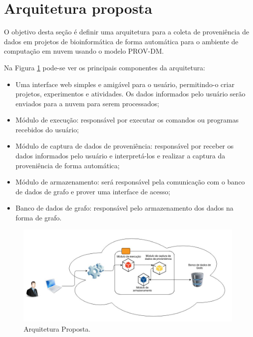 \section{Arquitetura proposta}

O objetivo desta seção é definir uma arquitetura para a coleta de proveniência de dados em projetos de bioinformática de forma automática para o ambiente de computação em nuvem usando o modelo PROV-DM.

Na Figura \ref{fig:arquitetura} pode-se ver os principais componentes da arquitetura: 

\begin{itemize}
\item Uma interface web simples e amigável para o usuário, permitindo-o criar projetos, experimentos e atividades. Os dados informados pelo usuário serão enviados para a nuvem para serem processados;
\item Módulo de execução: responsável por executar os comandos ou programas recebidos do usuário;
\item Módulo de captura de dados de proveniência: responsável por receber os dados informados pelo usuário e interpretá-los e realizar a captura da proveniência de forma automática;
\item Módulo de armazenamento: será responsável pela comunicação com o banco de dados de grafo e prover uma interface de acesso;
\item Banco de dados de grafo: responsável pelo armazenamento dos dados na forma de grafo.
\end{itemize}

\begin{figure}[h!]
\centering
\includegraphics[width=450pt]{images/ArquiteturaPropostaII.jpg}
\caption{Arquitetura Proposta.}
\label{fig:arquitetura}
\end{figure}


